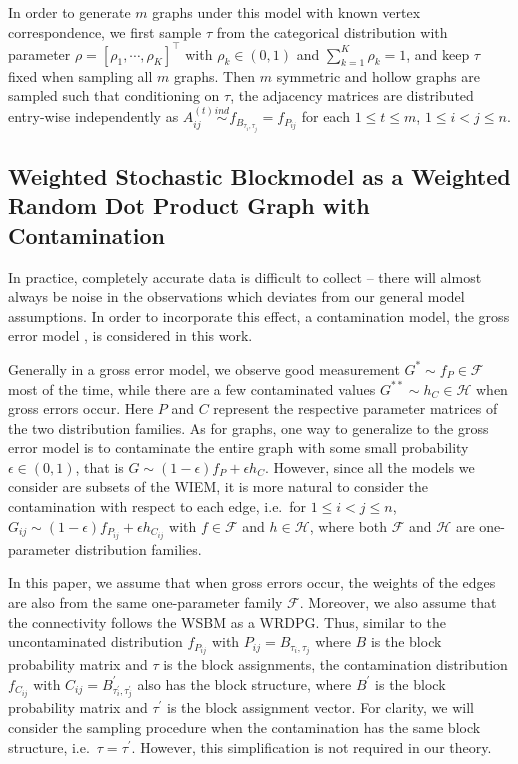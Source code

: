 \documentclass[a4paper]{article}
\begin{document}
In order to generate $m$ graphs under this model with known vertex correspondence, we first sample $\tau$ from the categorical distribution with parameter $\rho = [\rho_1, \cdots, \rho_K]^{\top}$ with $\rho_k \in (0, 1)$ and $\sum_{k = 1}^{K} \rho_k = 1$, and keep $\tau$ fixed when sampling all $m$ graphs. Then $m$ symmetric and hollow graphs are sampled such that conditioning on $\tau$, the adjacency matrices are distributed entry-wise independently as $A^{(t)}_{ij} \stackrel{ind}{\sim} f_{B_{\tau_i, \tau_j}} = f_{P_{ij}}$ for each $1 \le t \le m$, $1 \le i < j \le n$.




\subsection{Weighted Stochastic Blockmodel as a Weighted Random Dot Product Graph with Contamination}
\label{section:Contamination}

In practice, completely accurate data is difficult to collect -- there will almost always be noise in the observations which deviates from our general model assumptions. In order to incorporate this effect, a contamination model, the gross error model \citep{AIC:AIC690280519, bickel2007mathematical}, is considered in this work.

Generally in a gross error model, we observe good measurement $G^* \sim f_P \in \mathcal{F}$ most of the time, while there are a few contaminated values $G^{**} \sim h_C \in \mathcal{H}$ when gross errors occur. Here $P$ and $C$ represent the respective parameter matrices of the two distribution families.
As for graphs, one way to generalize to the gross error model is to contaminate the entire graph with some small probability $\epsilon \in (0, 1)$, that is $G \sim (1-\epsilon) f_P + \epsilon h_C$. However, since all the models we consider are subsets of the WIEM, it is more natural to consider the contamination with respect to each edge, i.e.\ for $1 \le i <  j \le n$, $G_{ij} \sim (1-\epsilon) f_{P_{ij}} + \epsilon h_{C_{ij}}$ with $f \in \mathcal{F}$ and $h \in \mathcal{H}$, where both $\mathcal{F}$ and $\mathcal{H}$ are one-parameter distribution families.

In this paper, we assume that when gross errors occur, the weights of the edges are also from the same one-parameter family $\mathcal{F}$. Moreover, we also assume that the connectivity follows the WSBM as a WRDPG. Thus, similar to the uncontaminated distribution $f_{P_{ij}}$ with $P_{ij} = B_{\tau_i, \tau_j}$ where $B$ is the block probability matrix and $\tau$ is the block assignments, the contamination distribution $f_{C_{ij}}$ with $C_{ij} = B^{\prime}_{\tau^{\prime}_i, \tau^{\prime}_j}$ also has the block structure, where $B^{\prime}$ is the block probability matrix and $\tau^{\prime}$ is the block assignment vector. For clarity, we will consider the sampling procedure when the contamination has the same block structure, i.e.\ $\tau = \tau^{\prime}$. However, this simplification is not required in our theory.
\end{document}
